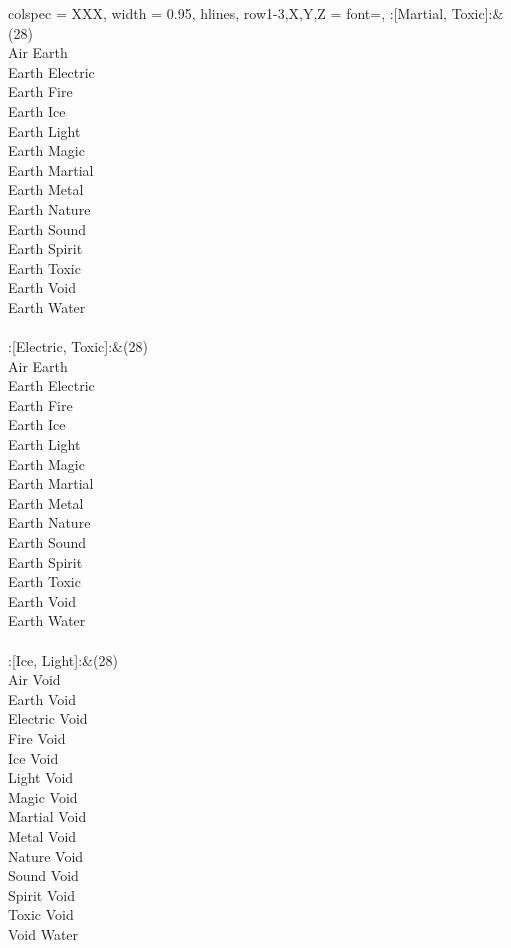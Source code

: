 \begin{longtblr}[
	caption = {2v2 Defending Weak},
	label = {2v2-Defending-Weak},
]{
	colspec = {XXX}, width = 0.95\linewidth,
	hlines,
	row{1-3,X,Y,Z} = {font=\bfseries},
}
	:[Martial, Toxic]:&{(28)\\
	Air Earth \\
	Earth Electric \\
	Earth Fire \\
	Earth Ice \\
	Earth Light \\
	Earth Magic \\
	Earth Martial \\
	Earth Metal \\
	Earth Nature \\
	Earth Sound \\
	Earth Spirit \\
	Earth Toxic \\
	Earth Void \\
	Earth Water \\
	}\\

	:[Electric, Toxic]:&{(28)\\
	Air Earth \\
	Earth Electric \\
	Earth Fire \\
	Earth Ice \\
	Earth Light \\
	Earth Magic \\
	Earth Martial \\
	Earth Metal \\
	Earth Nature \\
	Earth Sound \\
	Earth Spirit \\
	Earth Toxic \\
	Earth Void \\
	Earth Water \\
	}\\

	:[Ice, Light]:&{(28)\\
	Air Void \\
	Earth Void \\
	Electric Void \\
	Fire Void \\
	Ice Void \\
	Light Void \\
	Magic Void \\
	Martial Void \\
	Metal Void \\
	Nature Void \\
	Sound Void \\
	Spirit Void \\
	Toxic Void \\
	Void Water \\
	}\\

\end{longtblr}
\onecolumn
